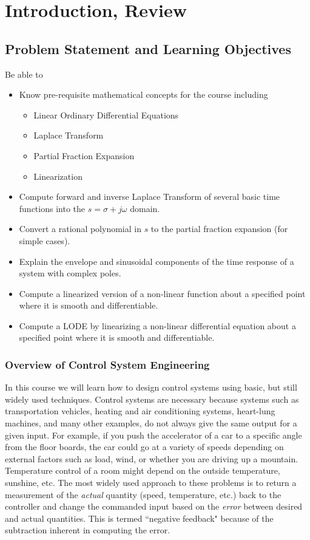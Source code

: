 %
%
%

\chapter{Introduction, Review}

\section{Problem Statement and Learning Objectives}

Be able to
\begin{itemize}
    \item Know pre-requisite mathematical concepts for the course including
    \begin{itemize}
        \item Linear Ordinary Differential Equations
        \item Laplace Transform
        \item Partial Fraction Expansion
        \item Linearization
    \end{itemize}
    \item Compute forward and inverse Laplace Transform of several basic time functions into the $s=\sigma+j\omega$ domain.
    \item Convert a rational polynomial in $s$ to the partial fraction expansion (for simple cases).
    \item Explain the envelope and sinusoidal components of the time response of a system with complex poles.
    \item Compute a linearized version of a non-linear function about a specified point where it is smooth and differentiable.
    \item Compute a LODE by linearizing a non-linear differential equation about a specified point where it is smooth and differentiable.
\end{itemize}


\subsection{Overview of Control System Engineering}


In this course we will learn how to design control systems using basic, but still widely used techniques.
Control systems are necessary because systems such as transportation vehicles, heating and air conditioning systems,
heart-lung machines, and many other examples, do not always give the same output for a given input.  For example,
if you push the accelerator of a car to a specific angle from the floor boards, the car could go at a variety of speeds
depending on external factors such as load, wind, or whether you are driving up a mountain.   Temperature control of a room
might depend on the outside temperature, sunshine, etc.   The most widely used approach to these problems is to
return a measurement of the {\it actual } quantity (speed, temperature, etc.) back to the controller and change the
commanded input based on the {\it error} between desired and actual quantities.    This is termed ``negative feedback"
because of the subtraction inherent in computing the error.

